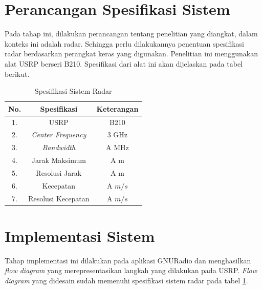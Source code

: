 \section{Perancangan Spesifikasi Sistem}
Pada tahap ini, dilakukan perancangan tentang penelitian yang diangkat, dalam konteks ini adalah radar. Sehingga perlu dilakukannya penentuan spesifikasi radar berdasarkan perangkat keras yang digunakan. Penelitian ini menggunakan alat USRP berseri B210.  Spesifikasi dari alat ini akan dijelaskan pada tabel berikut.

\begin{center}
	\begin{longtable}{| c | c | c |}
		\caption{Spesifikasi Sistem Radar}
		\label{tab:spekRadar}\\
		\hline
		No. & Spesifikasi 					& Keterangan\\\hline
		1.  & USRP 							& B210\\
		2.  & \textit{Center Frequency}  	& 3 GHz \\
		3.  & \textit{Bandwidth} 			& A MHz \\
		4.  & Jarak Maksimum 				& A m \\
		5.  & Resolusi Jarak 				& A m \\
		6.  & Kecepatan 					& A $m/s$ \\
		7.  & Resolusi Kecepatan 			& A $m/s$\\
		\hline
	\end{longtable}
\end{center}


\section{Implementasi Sistem}
Tahap implementasi ini dilakukan pada aplikasi GNURadio dan menghasilkan \textit{flow diagram} yang merepresentasikan langkah yang dilakukan pada USRP. \textit{Flow diagram} yang didesain sudah memenuhi spesifikasi sistem radar pada tabel \ref{tab:spekRadar}.



